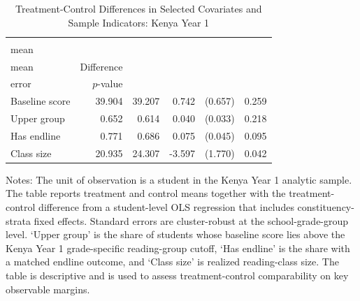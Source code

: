 \begin{table}[htbp]
\caption{Treatment-Control Differences in Selected Covariates and Sample Indicators: Kenya Year 1}
\label{tab:ke_balance}
\begin{center}
\begin{small}
\begin{threeparttable}
\begin{tabular}{l*{5}{r}}
\toprule
 & \Longstack{Treatment\\ mean} & \Longstack{Control\\ mean} & Difference & \Longstack{Standard\\ error} & $p$-value \\
\midrule
Baseline score & 39.904 & 39.207 & 0.742 & (0.657) & 0.259 \\
Upper group & 0.652 & 0.614 & 0.040 & (0.033) & 0.218 \\
Has endline & 0.771 & 0.686 & 0.075 & (0.045) & 0.095 \\
Class size & 20.935 & 24.307 & -3.597 & (1.770) & 0.042 \\
\bottomrule
\end{tabular}
\begin{tablenotes}
\footnotesize \item Notes: The unit of observation is a student in the Kenya Year 1 analytic sample. The table reports treatment and control means together with the treatment-control difference from a student-level OLS regression that includes constituency-strata fixed effects. Standard errors are cluster-robust at the school-grade-group level. `Upper group' is the share of students whose baseline score lies above the Kenya Year 1 grade-specific reading-group cutoff, `Has endline' is the share with a matched endline outcome, and `Class size' is realized reading-class size. The table is descriptive and is used to assess treatment-control comparability on key observable margins.
\end{tablenotes}
\end{threeparttable}
\end{small}
\end{center}
\end{table}